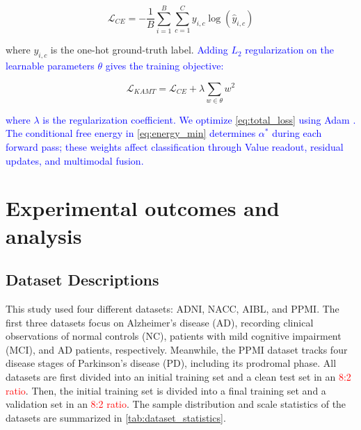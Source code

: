 \documentclass[lettersize,journal]{IEEEtran}
\begin{document}
    \begin{equation}
        \mathcal{L}_{CE} = - \frac{1}{B} \sum_{i=1}^{B} \sum_{c=1}^{C} y_{i,c} \log(\hat{y}_{i,c})
        \label{eq:cross_entropy}
    \end{equation}

    where $y_{i,c}$ is the one-hot ground-truth label. \textcolor{blue}{Adding $L_2$ regularization on the learnable parameters $\theta$ gives the training objective:}

    \begin{equation}
        \mathcal{L}_{KAMT} = \mathcal{L}_{CE} + \lambda \sum_{w \in \theta} w^2
        \label{eq:total_loss}
    \end{equation}

    \textcolor{blue}{where $\lambda$ is the regularization coefficient. We optimize \cref{eq:total_loss} using Adam \cite{kingma2014adam}. The conditional free energy in \cref{eq:energy_min} determines $\alpha^*$ during each forward pass; these weights affect classification through Value readout, residual updates, and multimodal fusion.}

\section{Experimental outcomes and analysis}


\subsection{Dataset Descriptions}
This study used four different datasets: ADNI\cite{weiner2013adni}, NACC\cite{beekly2007nacc}, AIBL\cite{ellis2009aibl}, and PPMI\cite{marek2011ppmi}. The first three datasets focus on Alzheimer's disease (AD), recording clinical observations of normal controls (NC), patients with mild cognitive impairment (MCI), and AD patients, respectively. Meanwhile, the PPMI dataset tracks four disease stages of Parkinson's disease (PD), including its prodromal phase. All datasets are first divided into an initial training set and a clean test set in an \textcolor{red}{8:2 ratio}. Then, the initial training set is divided into a final training set and a validation set in an \textcolor{red}{8:2 ratio}. The sample distribution and scale statistics of the datasets are summarized in \cref{tab:dataset_statistics}.
\end{document}
